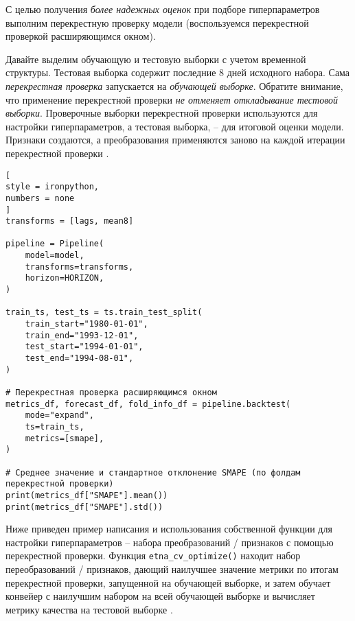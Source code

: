 \documentclass[%
	11pt,
	a4paper,
	utf8,
		]{article}
\begin{document}
С целью получения \emph{более надежных оценок} при подборе гиперпараметров выполним перекрестную проверку модели (воспользуемся перекрестной проверкой расширяющимся окном).

Давайте выделим обучающую и тестовую выборки с учетом временной структуры. Тестовая выборка содержит последние 8 дней исходного набора. Сама \emph{перекрестная проверка} запускается на \emph{обучающей выборке}. Обратите внимание, что применение перекрестной проверки \emph{не отменяет откладывание тестовой выборки}. Проверочные выборки перекрестной проверки используются для настройки гиперпараметров, а тестовая выборка, -- для итоговой оценки модели. Признаки создаются, а преобразования применяются заново на каждой итерации перекрестной проверки \cite[]{gruzdev:time-series-2022}.

\begin{lstlisting}[
style = ironpython,
numbers = none
]
transforms = [lags, mean8]

pipeline = Pipeline(
    model=model,
    transforms=transforms,
    horizon=HORIZON,
)

train_ts, test_ts = ts.train_test_split(
    train_start="1980-01-01",
    train_end="1993-12-01",
    test_start="1994-01-01",
    test_end="1994-08-01",
)

# Перекрестная проверка расширяющимся окном
metrics_df, forecast_df, fold_info_df = pipeline.backtest(
    mode="expand",
    ts=train_ts,
    metrics=[smape],
)

# Среднее значение и стандартное отклонение SMAPE (по фолдам перекрестной проверки)
print(metrics_df["SMAPE"].mean())
print(metrics_df["SMAPE"].std())
\end{lstlisting}

Ниже приведен пример написания и использования собственной функции для настройки гиперпараметров -- набора преобразований / признаков с помощью перекрестной проверки. Функция \verb|etna_cv_optimize()| находит набор переобразований / признаков, дающий наилучшее значение метрики по итогам перекрестной проверки, запущенной на обучающей выборке, и затем обучает конвейер с наилучшим набором на всей обучающей выборке и вычисляет метрику качества на тестовой выборке \cite[]{gruzdev:time-series-2022}.
\end{document}
